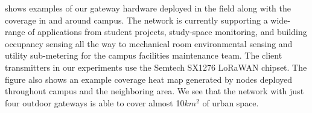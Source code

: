  shows examples of our gateway hardware deployed in the field along with the coverage in and around campus.  The network is currently supporting a wide-range of applications from student projects, study-space monitoring, and building occupancy sensing all the way to mechanical room environmental sensing and utility sub-metering for the campus facilities maintenance team.  The client transmitters in our experiments use the Semtech SX1276 LoRaWAN chipset. The figure also shows an example coverage heat map generated by nodes deployed throughout campus and the neighboring area.  We see that the network with just four outdoor gateways is able to cover almost 10$km^2$ of urban space.

